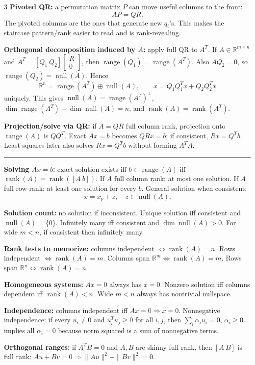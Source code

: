 \documentclass[10pt]{article}
\newcommand{\sect}[1]{\vspace{0.9pt}{\fontsize{7.2}{7.5}\selectfont\textbf{#1}}\vspace{0.25pt}\hrule\vspace{0.8pt}}
\newcommand{\sub}[1]{\textbf{#1}}
\newcommand{\R}{\mathbb{R}}
\newcommand{\rank}{\operatorname{rank}}
\newcommand{\range}{\operatorname{range}}
\newcommand{\nullsp}{\operatorname{null}}
\begin{document}
\begin{multicols*}{3}
\sub{Pivoted QR:} a permutation matrix \(P\) can move useful columns to
the front:
\[
AP=QR .
\]
The pivoted columns are the ones that generate new \(q_i\)'s. This makes
the staircase pattern/rank easier to read and is rank-revealing.

\sub{Orthogonal decomposition induced by \(A\):} apply full QR to
\(A^T\). If \(A\in\R^{m\times n}\) and
\(A^T=[Q_1\ Q_2]\begin{bmatrix}R\\0\end{bmatrix}\), then
\(\range(Q_1)=\range(A^T)\). Also \(AQ_2=0\), so
\(\range(Q_2)=\nullsp(A)\). Hence
\[
\R^n=\range(A^T)\oplus\nullsp(A),\qquad
x=Q_1Q_1^Tx+Q_2Q_2^Tx
\]
uniquely. This gives \(\nullsp(A)=\range(A^T)^\perp\),
\(\dim\range(A^T)+\dim\nullsp(A)=n\), and \(\rank(A)=\rank(A^T)\).

\sub{Projection/solve via QR:} if \(A=QR\) full column rank, projection
onto \(\range(A)\) is \(QQ^T\). Exact \(Ax=b\) becomes \(QRx=b\); if
consistent, \(Rx=Q^Tb\). Least-squares later also solves \(Rx=Q^Tb\)
without forming \(A^TA\).

\sect{Linear Equations / Consistency Tricks}
\sub{Solving $Ax=b$:} exact solution exists iff $b\in\range(A)$ iff $\rank(A)=\rank([A\ b])$. If $A$ full column rank: at most one solution. If $A$ full row rank: at least one solution for every $b$. General solution when consistent:
\[
x=x_p+z,\quad z\in\nullsp(A).
\]

\sub{Solution count:} no solution if inconsistent. Unique solution iff consistent and $\nullsp(A)=\{0\}$. Infinitely many iff consistent and $\dim\nullsp(A)>0$. For wide $m<n$, if consistent then infinitely many.

\sub{Rank tests to memorize:} columns independent $\Leftrightarrow\rank(A)=n$. Rows independent $\Leftrightarrow\rank(A)=m$. Columns span $\R^m\Leftrightarrow\rank(A)=m$. Rows span $\R^n\Leftrightarrow\rank(A)=n$.

\sub{Homogeneous systems:} $Ax=0$ always has $x=0$. Nonzero solution iff columns dependent iff $\rank(A)<n$. Wide $m<n$ always has nontrivial nullspace.

\sub{Independence:} columns independent iff $Ax=0\Rightarrow x=0$. Nonnegative independence: if every $u_i\ne0$ and $u_i^Tu_j\ge0$ for all $i,j$, then $\sum_i\alpha_i u_i=0$, $\alpha_i\ge0$ implies all $\alpha_i=0$ because norm squared is a sum of nonnegative terms.

\sub{Orthogonal ranges:} if $A^TB=0$ and $A,B$ are skinny full rank, then $[A\ B]$ is full rank: $Au+Bv=0\Rightarrow \|Au\|^2+\|Bv\|^2=0$.


\end{multicols*}
\end{document}
